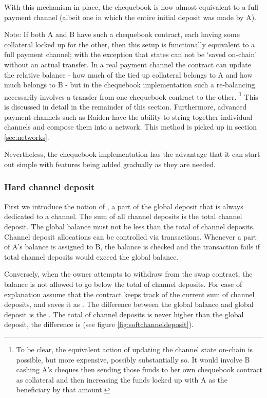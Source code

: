 With this mechanism in place, the chequebook is now almost equivalent to a full payment channel (albeit one in which the entire initial deposit was made by A).

Note: If both A and B have such a chequebook contract, each having some collateral locked up for the other, then this setup is functionally equivalent to a full payment channel; with the exception that states can not be `saved on-chain' without an actual transfer. In a real payment channel the contract can update the relative balance - how much of the tied up collateral belongs to A and how much belongs to B - but in the chequebook implementation such a re-balancing necessarily involves a transfer from one chequebook contract to the other.%
%
\footnote{To be clear, the equivalent action of updating the channel state on-chain is possible, but more expensive, possibly substantially so. It would involve B cashing A's cheques then sending those funds to her own chequebook contract as collateral and then increasing the funds locked up with A as the beneficiary by that amount.} 
%
This is discussed in detail in the remainder of this section.
Furthermore, advanced payment channels such as Raiden \cite{citation-needed:Raiden} have the ability to string together individual channels and compose them into a network. This method is picked up in section \ref{sec:networks}.

Nevertheless, the chequebook implementation has the advantage that it can start out simple with features being added gradually as they are needed.

\subsubsection{Hard channel deposit}

First we introduce the notion of , a part of the global deposit that is always dedicated to a channel. The sum of all channel deposits is the total channel deposit. The global balance must not be less than the total of channel deposits. Channel deposit allocations can be controlled via transactions. Whenever a part of A's balance is assigned to B, the balance is checked and the transaction fails if total  channel deposits would exceed the global balance.

Conversely, when the owner attempts to withdraw from the swap contract, the balance is not allowed to go below the total of channel deposits. For ease of explanation assume that the contract keeps track of the current sum of channel deposits, and saves it as . The difference between the global balance and global deposit is the . The total of channel deposits is never higher than the global deposit, the difference is  (see figure \ref{fig:softchanneldeposit}).

